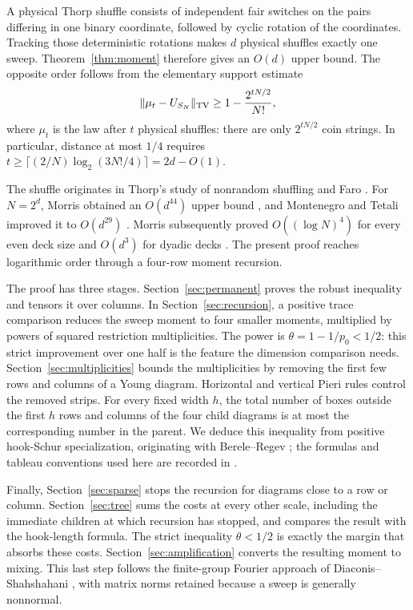 A physical Thorp shuffle consists of independent fair switches on the pairs differing in one binary coordinate, followed by cyclic rotation of the coordinates. Tracking those deterministic rotations makes $d$ physical shuffles exactly one sweep. Theorem~\ref{thm:moment} therefore gives an $O(d)$ upper bound. The opposite order follows from the elementary support estimate
\begin{equation}\label{eq:support-intro}
 \|\mu_t-U_{S_N}\|_{\operatorname{TV}}\ge1-\frac{2^{tN/2}}{N!},
\end{equation}
where $\mu_t$ is the law after $t$ physical shuffles: there are only $2^{tN/2}$ coin strings. In particular, distance at most $1/4$ requires
$t\ge\lceil(2/N)\log_2(3N!/4)\rceil=2d-O(1)$.

The shuffle originates in Thorp's study of nonrandom shuffling and Faro \cite{Thorp1973}. For $N=2^d$, Morris obtained an $O(d^{44})$ upper bound \cite{Morris2008}, and Montenegro and Tetali improved it to $O(d^{29})$ \cite[Theorems~6.14--6.15]{MontenegroTetali2006}. Morris subsequently proved $O((\log N)^4)$ for every even deck size \cite{Morris2009} and $O(d^3)$ for dyadic decks \cite{Morris2013}. The present proof reaches logarithmic order through a four-row moment recursion.

The proof has three stages. Section~\ref{sec:permanent} proves the robust inequality and tensors it over columns. In Section~\ref{sec:recursion}, a positive trace comparison reduces the sweep moment to four smaller moments, multiplied by powers of squared restriction multiplicities. The power is
$\theta=1-1/p_0<1/2$: this strict improvement over one half is the feature the dimension comparison needs. Section~\ref{sec:multiplicities} bounds the multiplicities by removing the first few rows and columns of a Young diagram. Horizontal and vertical Pieri rules control the removed strips. For every fixed width $h$, the total number of boxes outside the first $h$ rows and columns of the four child diagrams is at most the corresponding number in the parent. We deduce this inequality from positive hook-Schur specialization, originating with Berele--Regev \cite{BereleRegev1987}; the formulas and tableau conventions used here are recorded in \cite{orellana-zabrocki2000,mason-niese2016}.

Finally, Section~\ref{sec:sparse} stops the recursion for diagrams close to a row or column. Section~\ref{sec:tree} sums the costs at every other scale, including the immediate children at which recursion has stopped, and compares the result with the hook-length formula. The strict inequality $\theta<1/2$ is exactly the margin that absorbs these costs. Section~\ref{sec:amplification} converts the resulting moment to mixing. This last step follows the finite-group Fourier approach of Diaconis--Shahshahani \cite{DiaconisShahshahani1981}, with matrix norms retained because a sweep is generally nonnormal.

